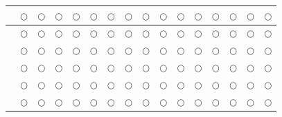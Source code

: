 \documentclass[12pt]{article}
\begin{document}
\begin{center}
\begin{longtable}{ |p{6cm}|c|c|c|c|c|c|c|c|c|c|c|c|c|c|c|}
&$\bigcirc$&$\bigcirc$
&$\bigcirc$&$\bigcirc$&$\bigcirc$&$\bigcirc$&$\bigcirc$&$\bigcirc$&$\bigcirc$&$\bigcirc$&$\bigcirc$&$\bigcirc$&$\bigcirc$&$\bigcirc$&$\bigcirc$\\
\hline

&$\bigcirc$&$\bigcirc$
&$\bigcirc$&$\bigcirc$&$\bigcirc$&$\bigcirc$&$\bigcirc$&$\bigcirc$&$\bigcirc$&$\bigcirc$&$\bigcirc$&$\bigcirc$&$\bigcirc$&$\bigcirc$&$\bigcirc$\\
\hline

&$\bigcirc$&$\bigcirc$
&$\bigcirc$&$\bigcirc$&$\bigcirc$&$\bigcirc$&$\bigcirc$&$\bigcirc$&$\bigcirc$&$\bigcirc$&$\bigcirc$&$\bigcirc$&$\bigcirc$&$\bigcirc$&$\bigcirc$\\
\hline

&$\bigcirc$&$\bigcirc$
&$\bigcirc$&$\bigcirc$&$\bigcirc$&$\bigcirc$&$\bigcirc$&$\bigcirc$&$\bigcirc$&$\bigcirc$&$\bigcirc$&$\bigcirc$&$\bigcirc$&$\bigcirc$&$\bigcirc$\\
\hline

&$\bigcirc$&$\bigcirc$
&$\bigcirc$&$\bigcirc$&$\bigcirc$&$\bigcirc$&$\bigcirc$&$\bigcirc$&$\bigcirc$&$\bigcirc$&$\bigcirc$&$\bigcirc$&$\bigcirc$&$\bigcirc$&$\bigcirc$\\
\hline

&$\bigcirc$&$\bigcirc$
&$\bigcirc$&$\bigcirc$&$\bigcirc$&$\bigcirc$&$\bigcirc$&$\bigcirc$&$\bigcirc$&$\bigcirc$&$\bigcirc$&$\bigcirc$&$\bigcirc$&$\bigcirc$&$\bigcirc$\\
\hline


\end{longtable}
\end{center}
\end{document}
